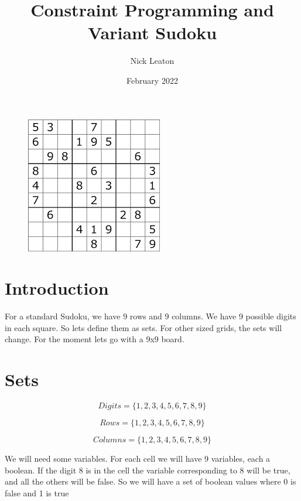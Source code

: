 \documentclass{article}
\title{Constraint Programming and Variant Sudoku}
\author{Nick Leaton}
\date{February 2022}
\begin{document}
\maketitle

\begin{figure}[!hb]
\centering
\includegraphics{sudoku}
\end{figure}

\newpage
\tableofcontents


\newpage
\section{Introduction}

For a standard Sudoku, we have 9 rows and 9 columns. We have 9 possible digits in each square. So lets
define them as sets.  For other sized grids, the sets will change.  For the moment lets go with a 9x9 board.


\section{Sets}

\begin{equation}
Digits=\lbrace1,2,3,4,5,6,7,8,9 \rbrace
\end{equation}

\begin{equation}
Rows=\lbrace1,2,3,4,5,6,7,8,9 \rbrace
\end{equation}

\begin{equation}
Columns=\lbrace1,2,3,4,5,6,7,8,9 \rbrace
\end{equation}

We will need some variables. For each cell we will have 9 variables, each a boolean. If the digit 8 is in the cell
the variable corresponding to 8 will be true, and all the others will be false.  So we will have a set of boolean values 
where 0 is false and 1 is true
\end{document}
